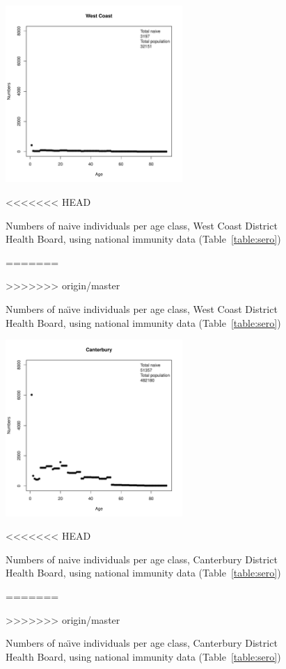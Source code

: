 \documentclass{article}
\begin{document}
\begin{itemize}
\begin{figure}[H]
     \begin{center}
     \includegraphics[width=0.6\textwidth]{dhb17.pdf}
     \end{center}
<<<<<<< HEAD
     \caption{Numbers of naive individuals per age class, West Coast District Health Board, using national immunity data (Table~\ref{table:sero})}
=======
     \caption{Numbers of na\"{\i}ve individuals per age class, West Coast District Health Board, using national immunity data (Table~\ref{table:sero})}
>>>>>>> origin/master
     \label{fig:WestCoast}
\end{figure}

\begin{figure}[H]
   \begin{center}
     \includegraphics[width=0.6\textwidth]{dhb18.pdf}
     \end{center}
<<<<<<< HEAD
     \caption{Numbers of naive individuals per age class, Canterbury District Health Board, using national immunity data (Table~\ref{table:sero})}
=======
     \caption{Numbers of na\"{\i}ve individuals per age class, Canterbury District Health Board, using national immunity data (Table~\ref{table:sero})}
>>>>>>> origin/master
     \label{fig:Canterbury}
\end{figure}


\end{itemize}
\end{document}
